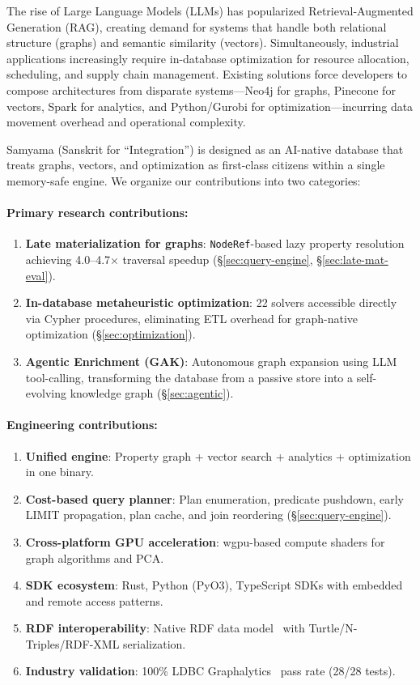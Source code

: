 \documentclass[11pt]{article}
\begin{document}
The rise of Large Language Models (LLMs) has popularized Retrieval-Augmented Generation (RAG), creating demand for systems that handle both relational structure (graphs) and semantic similarity (vectors). Simultaneously, industrial applications increasingly require in-database optimization for resource allocation, scheduling, and supply chain management. Existing solutions force developers to compose architectures from disparate systems---Neo4j for graphs, Pinecone for vectors, Spark for analytics, and Python/Gurobi for optimization---incurring data movement overhead and operational complexity.

Samyama (Sanskrit for ``Integration'') is designed as an AI-native database that treats graphs, vectors, and optimization as first-class citizens within a single memory-safe engine. We organize our contributions into two categories:

\paragraph{Primary research contributions:}
\begin{enumerate}[leftmargin=*]
  \item \textbf{Late materialization for graphs}: \texttt{NodeRef}-based lazy property resolution~\citep{abadi2008column} achieving 4.0--4.7$\times$ traversal speedup (\S\ref{sec:query-engine}, \S\ref{sec:late-mat-eval}).
  \item \textbf{In-database metaheuristic optimization}: 22 solvers accessible directly via Cypher procedures, eliminating ETL overhead for graph-native optimization (\S\ref{sec:optimization}).
  \item \textbf{Agentic Enrichment (GAK)}: Autonomous graph expansion using LLM tool-calling, transforming the database from a passive store into a self-evolving knowledge graph (\S\ref{sec:agentic}).
\end{enumerate}

\paragraph{Engineering contributions:}
\begin{enumerate}[leftmargin=*,resume]
  \item \textbf{Unified engine}: Property graph + vector search + analytics + optimization in one binary.
  \item \textbf{Cost-based query planner}: Plan enumeration, predicate pushdown, early LIMIT propagation, plan cache, and join reordering (\S\ref{sec:query-engine}).
  \item \textbf{Cross-platform GPU acceleration}: wgpu-based compute shaders for graph algorithms and PCA.
  \item \textbf{SDK ecosystem}: Rust, Python (PyO3), TypeScript SDKs with embedded and remote access patterns.
  \item \textbf{RDF interoperability}: Native RDF data model~\citep{w3c2014rdf} with Turtle/N-Triples/RDF-XML serialization.
  \item \textbf{Industry validation}: 100\% LDBC Graphalytics~\citep{iosup2016ldbc} pass rate (28/28 tests).
\end{enumerate}
\end{document}
